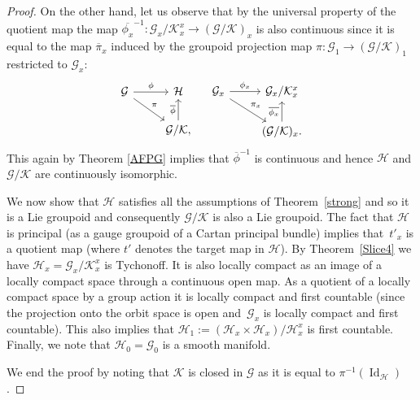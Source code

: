 \documentclass[pdftex]{sigma}
\begin{document}
\begin{proof}
On the other hand, let us observe that by the universal property of the quotient map the map $\overline{\phi_x}^{-1}\colon \mathcal{G}_x\slash\mathcal{K}_x^x\rightarrow (\mathcal{G}\slash\mathcal{K})_x$ is also continuous since it is equal to the map $\overline{\pi}_x$ induced by the groupoid projection map $\pi\colon \mathcal{G}_1\rightarrow(\mathcal{G}\slash\mathcal{K})_1$ restricted to $\mathcal{G}_x$: %
\begin{equation*}
\begin{tikzcd}
\mathcal{G}\arrow[rd, "\pi"] \arrow[r, "\phi"] & \mathcal{H} \\
& \mathcal{G}\slash\mathcal{K},\arrow[u, "\overline{\phi}"]
\end{tikzcd}
\quad
\begin{tikzcd}
\mathcal{G}_x\arrow[rd, "\pi_x"] \arrow[r, "\phi_x"] & \mathcal{G}_x\slash\mathcal{K}_x^x \\
& (\mathcal{G}\slash\mathcal{K})_x.\arrow[u, "\overline{\phi_x}"]
\end{tikzcd}
\end{equation*}
This again by Theorem \ref{AFPG} implies that $\overline{\phi}^{-1}$ is continuous and hence $\mathcal{H}$ and $\mathcal{G}\slash\mathcal{K}$ are conti\-nuous\-ly isomorphic.

We now show that $\mathcal{H}$ satisfies all the assumptions of Theorem~\ref{strong} and so it is a Lie groupoid and consequently $\mathcal{G}\slash\mathcal{K}$ is also a Lie groupoid. The fact that $\mathcal{H}$ is principal (as a gauge groupoid of a Cartan principal bundle) implies that~$t'_x$ is a quotient map (where $t'$ denotes the target map in $\mathcal{H}$). By Theorem~\ref{Slice4} we have $\mathcal{H}_x=\mathcal{G}_x\slash\mathcal{K}_x^x$ is Tychonoff. It is also locally compact as an image of a locally compact space through a continuous open map. As a quotient of a locally compact space by a group action it is locally compact and first countable (since the projection onto the orbit space is open and~$\mathcal{G}_x$ is locally compact and first countable). This also implies that $\mathcal{H}_1:=(\mathcal{H}_x\times\mathcal{H}_x)\slash\mathcal{H}^x_x$ is first countable. Finally, we note that $\mathcal{H}_0=\mathcal{G}_0$ is a smooth manifold.

We end the proof by noting that $\mathcal{K}$ is closed in $\mathcal{G}$ as it is equal to $\pi^{-1}(\operatorname{Id}_{\mathcal{H}})$.
\end{proof}
\end{document}
